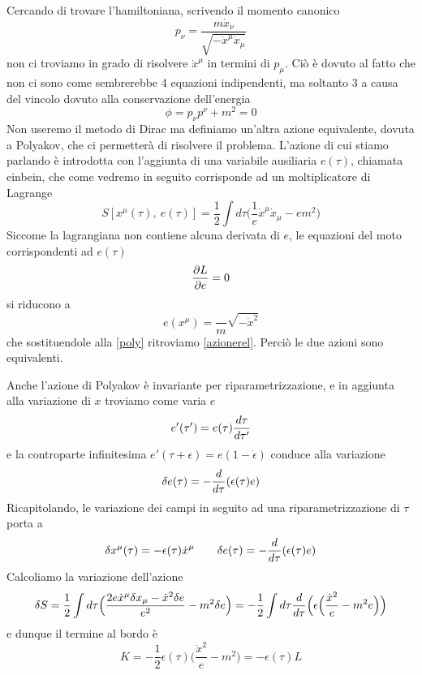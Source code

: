     Cercando di trovare l'hamiltoniana, scrivendo il momento canonico 
\begin{equation*}
    p_\nu = \frac{m \dot x_\nu}{\sqrt{- \dot x^\mu \dot x_\mu}}
\end{equation*}
    non ci troviamo in grado di risolvere $\dot x^\mu$ in termini di $p_\mu$. Ciò è dovuto al fatto che non ci sono come sembrerebbe 4 equazioni indipendenti, ma soltanto 3 a causa del vincolo dovuto alla conservazione dell'energia 
\begin{equation*}
    \phi = p_\nu p^\nu + m^2 = 0
\end{equation*}
    Non useremo il metodo di Dirac ma definiamo un'altra azione equivalente, dovuta a Polyakov, che ci permetterà di risolvere il problema. L'azione di cui stiamo parlando è introdotta con l'aggiunta di una variabile ausiliaria $e(\tau)$, chiamata einbein, che come vedremo in seguito corrisponde ad un moltiplicatore di Lagrange
\begin{equation} \label{poly}
    S[x^\mu(\tau), ~ e(\tau)] = \frac{1}{2} \int d\tau \Big( \frac{1}{e} \dot x^\mu \dot x_\mu - e m^2 \Big)
\end{equation}
    Siccome la lagrangiana non contiene alcuna derivata di $e$, le equazioni del moto corrispondenti ad $e(\tau)$  
\begin{equation*}
    \frac{\partial L}{\partial e} = 0
\end{equation*}
    si riducono a
\begin{equation*}
    e(x^\mu) = \frac{}{m} \sqrt{-\dot x^2}
\end{equation*}
    che sostituendole alla \eqref{poly} ritroviamo \eqref{azionerel}. Perciò le due azioni sono equivalenti. 

    Anche l'azione di Polyakov è invariante per riparametrizzazione, e in aggiunta alla variazione di $x$ troviamo come varia $e$
\begin{equation*}
    e'(\tau') = e(\tau) \frac{d\tau}{d\tau'}
\end{equation*}
    e la controparte infinitesima $e'(\tau + \epsilon) = e(1 - \dot \epsilon)$ conduce alla variazione
\begin{equation*}
    \delta e(\tau) = - \frac{d}{d\tau} (\epsilon(\tau) e)
\end{equation*}
    Ricapitolando, le variazione dei campi in seguito ad una riparametrizzazione di $\tau$ porta a 
\begin{equation}
    \delta x^\mu(\tau) = - \epsilon(\tau) \dot x^\mu \qquad \delta e(\tau) = - \frac{d}{d\tau} (\epsilon(\tau) e)
\end{equation}
    Calcoliamo la variazione dell'azione
\begin{equation*}
    \delta S  = \frac{1}{2} \int d\tau \Big ( \frac{2 e \dot x^\mu \delta x_\mu - \dot x^2 \delta e}{e^2} - m^2 \delta e \Big) = -\frac{1}{2} \int d\tau \frac{d}{d\tau} \Big(\epsilon \Big (\frac{\dot x^2}{e} - m^2 e \Big )\Big)
\end{equation*}
    e dunque il termine al bordo è 
\begin{equation*}
    K = - \frac{1}{2} \epsilon(\tau) \Big (\frac{\dot x^2}{e} - m^2\Big ) = - \epsilon(\tau) L
\end{equation*}

